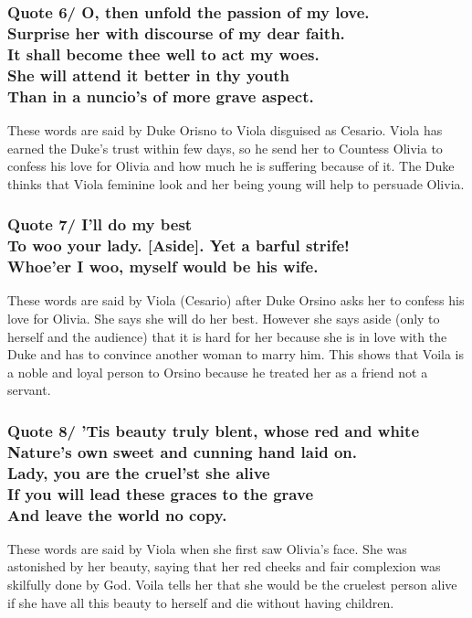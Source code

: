\documentclass[12pt, a4paper]{article}
\begin{document}
\subsubsection*{Quote 6/
O, then unfold the passion of my love.\\
Surprise her with discourse of my dear faith.\\
It shall become thee well to act my woes.\\
She will attend it better in thy youth\\
Than in a nuncio’s of more grave aspect.
}

These words are said by Duke Orisno to Viola disguised as Cesario.
Viola has earned the Duke's trust within few days, so he send her to 
Countess Olivia to confess his love for Olivia and how much he is 
suffering because of it. The Duke thinks that Viola feminine look and 
her being young will help to persuade Olivia.

\subsubsection*{Quote 7/
I’ll do my best\\
To woo your lady. [Aside]. Yet a barful strife!\\
Whoe’er I woo, myself would be his wife.
}

These words are said by Viola (Cesario) after Duke Orsino asks her
to confess his love for Olivia. She says she will do her best. However
she says aside (only to herself and the audience) that it is hard for
her because she is in love with the Duke and has to convince another 
woman to marry him. This shows that Voila is a noble and loyal
person to Orsino because he treated her as a friend not a servant.

\subsubsection*{Quote 8/
’Tis beauty truly blent, whose red and white\\
Nature’s own sweet and cunning hand laid on.\\
Lady, you are the cruel’st she alive\\
If you will lead these graces to the grave\\
And leave the world no copy.
}

These words are said by Viola when she first saw Olivia's face.
She was astonished by her beauty, saying that her red cheeks
and fair complexion was skilfully done by God. Voila tells her that 
she would be the cruelest person alive if she have all this 
beauty to herself and die without having children.
\end{document}
